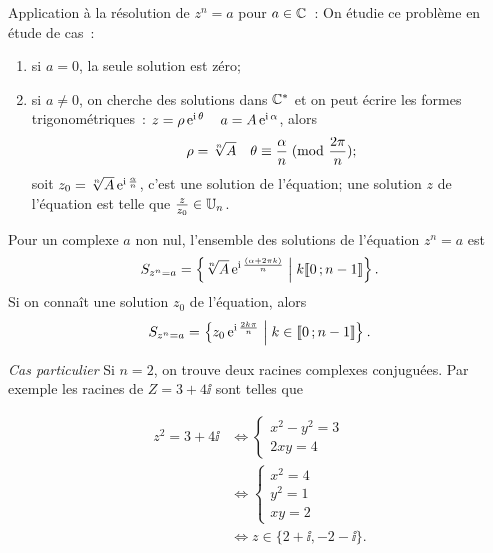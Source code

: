 Application à la résolution de \(z^n = a\) pour \(a \in \mathbb{C}\)~: On étudie ce 
problème en étude de cas~:
\begin{enumerate}
    \item si \(a = 0\), la seule solution est zéro;
    \item si \(a \neq 0\), on cherche des solutions dans \(\mathbb{C}^*\) et on peut 
        écrire les formes trigonométriques~: \(z = \rho \operatorname{e}^{\operatorname{i} \theta} \quad a = 
        A \operatorname{e}^{\operatorname{i} \alpha}\), alors
        \begin{equation}
            \rho = \sqrt[n]{A} \quad 
            \theta \equiv \frac{\alpha}{n}\!\pmod {\frac{2\pi}{n}};
        \end{equation}
        soit \(z_0 = \sqrt[n]{A}  \operatorname{e}^{\operatorname{i} \frac{\alpha}{n}}\), c'est une solution 
        de l'équation; une solution \(z\) de l'équation est telle que 
        \(\frac{z}{z_0} \in \mathbb{U}_n\).
\end{enumerate}

\begin{prop}
    Pour un complexe \(a\) non nul, l'ensemble des solutions de l'équation 
    \(z^n = a\) est
    \begin{equation}
        S_{z^n = a} = \left\{\sqrt[n]{A} \operatorname{e}^{\operatorname{i} \frac{(\alpha + 2\pi k)}{n}}\mathrel{}\middle|\mathrel{}k 
        \mathopen{\llbracket}0\mathclose{}\mathpunct{};n-1\mathclose{\rrbracket}\right\}.
    \end{equation}
    Si on connaît une solution \(z_0\) de l'équation, alors
    \begin{equation}
        S_{z^n = a} = \left\{z_0 \operatorname{e}^{\operatorname{i} \frac{2 k \pi}{n}}\mathrel{}\middle|\mathrel{}k \in 
        \mathopen{\llbracket}0\mathclose{}\mathpunct{};n-1\mathclose{\rrbracket}\right\}.
    \end{equation}
\end{prop}

\emph{Cas particulier}
Si \(n = 2\), on trouve deux racines complexes conjuguées. Par exemple les racines 
de \(Z = 3 + 4\ii\) sont telles que

\begin{align*}
    z^2 = 3 + 4\ii & \iff  \begin{cases} x^2-y^2 = 3 \\ 2xy = 4 \end{cases} \\
               & \iff \begin{cases} x^2 = 4 \\ y^2 = 1 \\ xy = 2 \end{cases} \\
               & \iff z \in \{2 + \ii, -2-\ii\}.
\end{align*}

